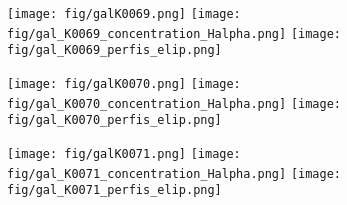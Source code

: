 \begin{figure}[!ht]
\begin{center}
\setcaptionmargin{1cm}
\texttt{[image: fig/galK0069.png]}
\texttt{[image: fig/gal\_K0069\_concentration\_Halpha.png]}
\texttt{[image: fig/gal\_K0069\_perfis\_elip.png]}
\end{center}
\end{figure}


\begin{figure}[!ht]
\begin{center}
\setcaptionmargin{1cm}
\texttt{[image: fig/galK0070.png]}
\texttt{[image: fig/gal\_K0070\_concentration\_Halpha.png]}
\texttt{[image: fig/gal\_K0070\_perfis\_elip.png]}
\end{center}
\end{figure}


\begin{figure}[!ht]
\begin{center}
\setcaptionmargin{1cm}
\texttt{[image: fig/galK0071.png]}
\texttt{[image: fig/gal\_K0071\_concentration\_Halpha.png]}
\texttt{[image: fig/gal\_K0071\_perfis\_elip.png]}
\end{center}
\end{figure}